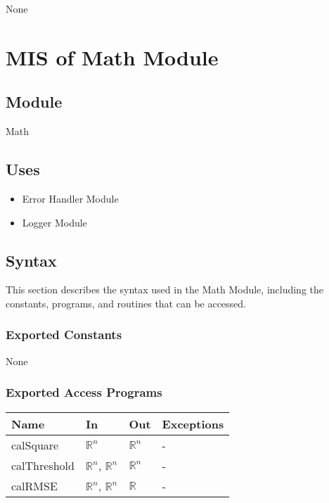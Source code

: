 \documentclass[12pt, titlepage]{article}
\begin{document}
None

\newpage

\section{MIS of Math Module} \label{MIS_Math}

\subsection{Module}

Math

\subsection{Uses}

\begin{itemize}
\item Error Handler Module
\item Logger Module
\end{itemize}

\subsection{Syntax}

This section describes the syntax used in the Math Module, including the
constants, programs, and routines that can be accessed.

\subsubsection{Exported Constants}

None

\subsubsection{Exported Access Programs}

\begin{center}
\begin{tabular}{p{2cm} p{4cm} p{4cm} p{2cm}}
\hline
\textbf{Name} & \textbf{In} & \textbf{Out} & \textbf{Exceptions} \\
\hline
calSquare & $\mathbb{R}^n$ & $\mathbb{R}^n$ & - \\
calThreshold & $\mathbb{R}^n$, $\mathbb{R}^n$ & $\mathbb{R}^n$ & - \\
calRMSE & $\mathbb{R}^n$, $\mathbb{R}^n$ & $\mathbb{R}$ & - \\
\hline
\end{tabular}
\end{center}
\end{document}
